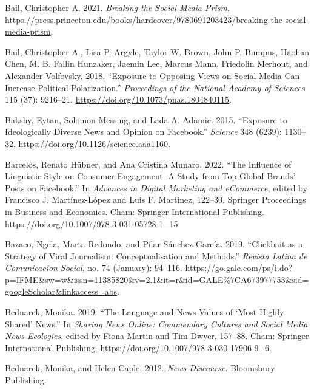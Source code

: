 \documentclass[
]{article}
\newlength{\cslhangindent}
\newlength{\cslentryspacingunit} %
\newenvironment{CSLReferences}[2] %
 {%
  \setlength{\parindent}{0pt}
  \ifodd #1
  \let\oldpar\par
  \def\par{\hangindent=\cslhangindent\oldpar}
  \fi
  \setlength{\parskip}{#2\cslentryspacingunit}
 }%
 {}
\begin{document}
\begin{CSLReferences}{1}{0}
\leavevmode{}%
Bail, Christopher A. 2021. \emph{Breaking the {Social} {Media} {Prism}}.
\url{https://press.princeton.edu/books/hardcover/9780691203423/breaking-the-social-media-prism}.

\leavevmode{}%
Bail, Christopher A., Lisa P. Argyle, Taylor W. Brown, John P. Bumpus,
Haohan Chen, M. B. Fallin Hunzaker, Jaemin Lee, Marcus Mann, Friedolin
Merhout, and Alexander Volfovsky. 2018. {``Exposure to Opposing Views on
Social Media Can Increase Political Polarization.''} \emph{Proceedings
of the National Academy of Sciences} 115 (37): 9216--21.
\url{https://doi.org/10.1073/pnas.1804840115}.

\leavevmode{}%
Bakshy, Eytan, Solomon Messing, and Lada A. Adamic. 2015. {``Exposure to
Ideologically Diverse News and Opinion on {Facebook}.''} \emph{Science}
348 (6239): 1130--32. \url{https://doi.org/10.1126/science.aaa1160}.

\leavevmode{}%
Barcelos, Renato Hübner, and Ana Cristina Munaro. 2022. {``The
{Influence} of {Linguistic} {Style} on {Consumer} {Engagement}: {A}
{Study} from {Top} {Global} {Brands}' {Posts} on {Facebook}.''} In
\emph{Advances in {Digital} {Marketing} and {eCommerce}}, edited by
Francisco J. Martínez-López and Luis F. Martinez, 122--30. Springer
{Proceedings} in {Business} and {Economics}. Cham: Springer
International Publishing.
\url{https://doi.org/10.1007/978-3-031-05728-1_15}.

\leavevmode{}%
Bazaco, Ngela, Marta Redondo, and Pilar Sánchez-García. 2019.
{``Clickbait as a Strategy of Viral Journalism: Conceptualisation and
Methods.''} \emph{Revista Latina de Comunicacion Social}, no. 74
(January): 94--116.
\url{https://go.gale.com/ps/i.do?p=IFME\&sw=w\&issn=11385820\&v=2.1\&it=r\&id=GALE\%7CA673977753\&sid=googleScholar\&linkaccess=abs}.

\leavevmode{}%
Bednarek, Monika. 2019. {``The {Language} and {News} {Values} of
{`{Most} {Highly} {Shared}'} {News}.''} In \emph{Sharing {News}
{Online}: {Commendary} {Cultures} and {Social} {Media} {News}
{Ecologies}}, edited by Fiona Martin and Tim Dwyer, 157--88. Cham:
Springer International Publishing.
\url{https://doi.org/10.1007/978-3-030-17906-9_6}.

\leavevmode{}%
Bednarek, Monika, and Helen Caple. 2012. \emph{News {Discourse}}.
Bloomsbury Publishing.


\end{CSLReferences}
\end{document}
